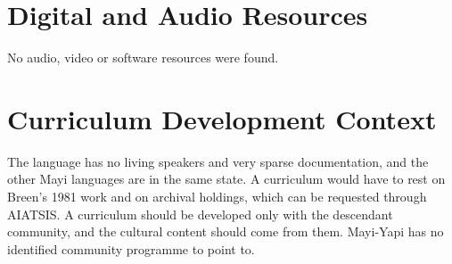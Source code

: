 \documentclass[12pt]{article}
\begin{document}
\section{Digital and Audio Resources}
No audio, video or software resources were found.

\section{Curriculum Development Context}
The language has no living speakers and very sparse documentation, and the other Mayi languages are in the same state. A curriculum would have to rest on Breen's 1981 work and on archival holdings, which can be requested through AIATSIS. A curriculum should be developed only with the descendant community, and the cultural content should come from them. Mayi-Yapi has no identified community programme to point to.
\end{document}
